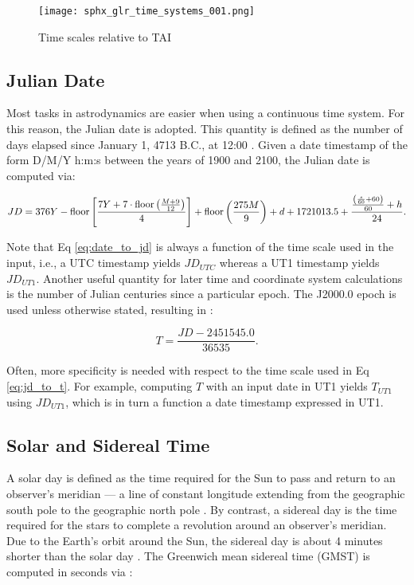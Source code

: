 \begin{figure}[ht]
  \centering
  \texttt{[image: sphx\_glr\_time\_systems\_001.png]}
  \caption{Time scales relative to TAI}
  \label{fig:time_scales}
\end{figure}

\subsection{Julian Date}

Most tasks in astrodynamics are easier when using a continuous time system. For this reason, the Julian date is adopted. This quantity is defined as the number of days elapsed since January 1, 4713 B.C., at 12:00 \cite{vallado4ed}. Given a date timestamp of the form D/M/Y h:m:s between the years of 1900 and 2100, the Julian date is computed via:

\begin{equation} \label{eq:date_to_jd}
  JD = 376Y - \operatorname{floor}{\left[ \frac{7Y + 7 \cdot \operatorname{floor}{\left(\frac{M + 9}{12} \right)}}{4} \right]}
      + \operatorname{floor}{\left(\frac{275M}{9}\right)} 
      + d
      + 1721013.5
      + \frac{\frac{\left(\frac{s}{60} + 60\right)}{60} + h}{24}.
\end{equation}

Note that Eq \ref{eq:date_to_jd} is always a function of the time scale used in the input, i.e., a UTC timestamp yields $JD_{UTC}$ whereas a UT1 timestamp yields $JD_{UT1}$. Another useful quantity for later time and coordinate system calculations is the number of Julian centuries since a particular epoch. The J2000.0 epoch is used unless otherwise stated, resulting in \cite{vallado4ed}:

\begin{equation} \label{eq:jd_to_t}
  T = \frac{JD - 2451545.0}{36535}.
\end{equation}

Often, more specificity is needed with respect to the time scale used in Eq \ref{eq:jd_to_t}. For example, computing $T$ with an input date in UT1 yields $T_{UT1}$ using $JD_{UT1}$, which is in turn a function a date timestamp expressed in UT1. 

\subsection{Solar and Sidereal Time}

A solar day is defined as the time required for the Sun to pass and return to an observer's meridian --- a line of constant longitude extending from the geographic south pole to the geographic north pole \cite{vallado4ed}. By contrast, a sidereal day is the time required for the stars to complete a revolution around an observer's meridian. Due to the Earth's orbit around the Sun, the sidereal day is about 4 minutes shorter than the solar day \cite{vallado4ed}. The Greenwich mean sidereal time (GMST) is computed in seconds via \cite{frueh2019notes}:

